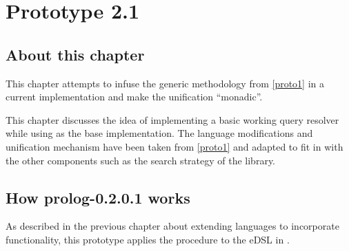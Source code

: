 \documentclass[thesis-solanki.tex]{subfiles}
\begin{document}
\chapter{Prototype 2.1}{\label{proto2.1}}

\section{About this chapter}
This chapter attempts to infuse the generic methodology from
\ref{proto1}
in a current  implementation \cite{prolog-lib}
and make the unification ``monadic''.

This chapter discusses the idea of implementing a basic working  query resolver while using \cite{prolog-lib} as the base
implementation. The language modifications and unification mechanism
have been taken from {\Huge \ref{proto1}}
and adapted to fit in with the other
components such as the search strategy of the library.


\section{How prolog-0.2.0.1 works}

As described in the previous chapter about extending languages to incorporate functionality, this prototype applies
the procedure to the eDSL in \cite{prolog-lib}.

\end{document}

